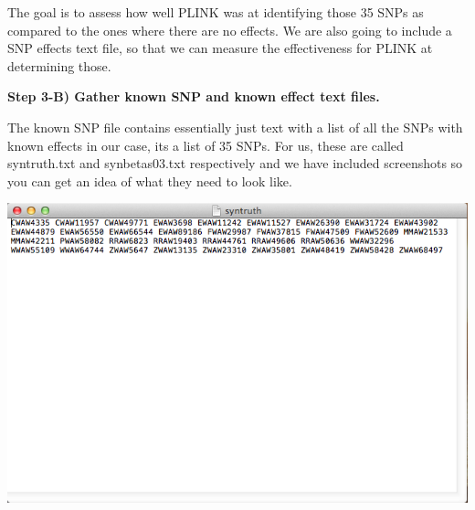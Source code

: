 \documentclass[twoside,a4paper]{refart}
\begin{document}
The goal is to assess how well PLINK was at identifying those 35 SNPs as compared to the ones where there are no effects. We are also going to include a SNP effects text file, so that we can measure the effectiveness for PLINK at determining those. 

\begin{center}
\end{center}

\textbf{Step 3-B) Gather known SNP and known effect text files.}

The known SNP file contains essentially just text with a list of all the SNPs with known effects in our case, its a list of 35 SNPs. For us, these are called syntruth.txt and synbetas03.txt respectively and we have included screenshots so you can get an idea of what they need to look like.

\includegraphics[width=\textwidth]{doc_step3_2}
\end{document}
